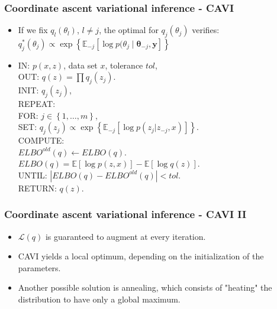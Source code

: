 \documentclass{beamer}
\begin{document}
\begin{frame}
\frametitle{Coordinate ascent variational inference - CAVI}
\begin{itemize}
\item If we fix $q_l(\theta_l)$, $l \neq j$, the optimal for $q_j(\theta_j)$ verifies: $q^*_j(\theta_j) \propto \exp\left\lbrace\mathbb{E}_{-j}\left[\log p(\theta_j \mid \boldsymbol{\theta}_{-j},\boldsymbol{y}\right]\right\rbrace$
\item \begin{text}
IN: $p(x,z)$, data set $x$, tolerance $tol$,\\
OUT: $q(z) = \prod q_j(z_j)$.\\
INIT: $q_j(z_j)$, \\
REPEAT:\\
\quad FOR: $j \in \left\lbrace1, \dots, m\right\rbrace$,\\
\quad \quad SET: $q_j(z_j) \propto \exp\left\lbrace\mathbb{E}_{-j}\left[\log p(z_j|z_{-j},x)\right]\right\rbrace$.\\
\quad COMPUTE:\\
\quad \quad $ELBO^{old}(q) \leftarrow ELBO(q)$.\\
\quad \quad $ELBO(q) = \mathbb{E}\left[\log p(z,x)\right] - \mathbb{E}\left[\log q(z) \right] $.\\
UNTIL: $|ELBO(q)-ELBO^{old}(q)|<tol$.\\
RETURN: $q(z).$
\end{text}
\end{itemize}
\end{frame}

\begin{frame}
\frametitle{Coordinate ascent variational inference - CAVI II}
\begin{itemize}
\item $\mathcal{L}(q)$ is guaranteed to augment at every iteration.
\item CAVI yields a local optimum, depending on the initialization of the parameters.
\item Another possible solution is annealing, which consists of "heating" the distribution to have only a global maximum.
\end{itemize}
\end{frame}
\end{document}
